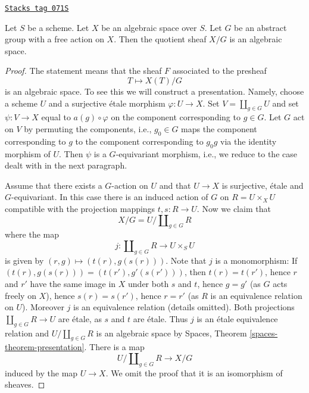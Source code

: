 \begin{lemma}[Quotient]
\label{spaces-properties-lemma-quotient}
\href{https://stacks.math.columbia.edu/tag/071S}{\texttt{Stacks tag 071S}}

Let $S$ be a scheme.
Let $X$ be an algebraic space over $S$.
Let $G$ be an abstract group with a free action on $X$.
Then the quotient sheaf $X/G$ is an algebraic space.
\end{lemma}

\begin{proof}
The statement means that the sheaf $F$ associated to the presheaf
$$
T \longmapsto X(T)/G
$$
is an algebraic space. To see this we will construct a presentation.
Namely, choose a scheme $U$ and a surjective \'etale morphism
$\varphi : U \to X$. Set $V = \coprod_{g \in G} U$ and set
$\psi : V \to X$ equal to $a(g) \circ \varphi$ on the component corresponding
to $g \in G$. Let $G$ act on $V$ by permuting the components, i.e.,
$g_0 \in G$ maps the component corresponding to $g$ to the component
corresponding to $g_0g$ via the identity morphism of $U$.
Then $\psi$ is a $G$-equivariant morphism, i.e., we reduce to the
case dealt with in the next paragraph.

\medskip\noindent
Assume that there exists a $G$-action on $U$ and that $U \to X$ is surjective,
\'etale and $G$-equivariant. In this case there is an induced
action of $G$ on $R = U \times_X U$ compatible with the projection
mappings $t, s : R \to U$. Now we claim that
$$
X/G = U/\coprod\nolimits_{g \in G} R
$$
where the map
$$
j : \coprod\nolimits_{g \in G} R
\longrightarrow
U \times_S U
$$
is given by $(r, g) \mapsto (t(r), g(s(r)))$. Note that $j$ is a monomorphism:
If $(t(r), g(s(r))) = (t(r'), g'(s(r')))$, then
$t(r) = t(r')$, hence $r$ and $r'$ have the same image in $X$ under
both $s$ and $t$, hence $g = g'$ (as $G$ acts freely on $X$), hence
$s(r) = s(r')$, hence $r = r'$ (as $R$ is an equivalence relation on $U$).
Moreover $j$ is an equivalence relation (details omitted).
Both projections $\coprod\nolimits_{g \in G} R \to U$ are \'etale, as
$s$ and $t$ are \'etale. Thus $j$ is an \'etale equivalence relation
and $U/\coprod\nolimits_{g \in G} R$ is an algebraic space by
Spaces, Theorem \ref{spaces-theorem-presentation}.
There is a map
$$
U/\coprod\nolimits_{g \in G} R \longrightarrow X/G
$$
induced by the map $U \to X$. We omit the proof that it is an
isomorphism of sheaves.
\end{proof}



